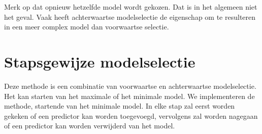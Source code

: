 \documentclass[12pt,dutch,coursenotes]{book}
\theoremstyle{definition}
\theoremstyle{definition}
\theoremstyle{definition}
\theoremstyle{remark}
\begin{document}
Merk op dat opnieuw hetzelfde model wordt gekozen. Dat is in het
algemeen niet het geval. Vaak heeft achterwaartse modelselectie de
eigenschap om te resulteren in een meer complex model dan voorwaartse
selectie.

\section{Stapsgewijze modelselectie}\label{stapsgewijze-modelselectie}

Deze methode is een combinatie van voorwaartse en achterwaartse
modelselectie. Het kan starten van het maximale of het minimale model.
We implementeren de methode, startende van het minimale model. In elke
stap zal eerst worden gekeken of een predictor kan worden toegevoegd,
vervolgens zal worden nagegaan of een predictor kan worden verwijderd
van het model.
\end{document}
